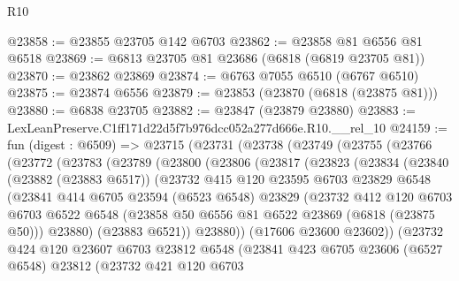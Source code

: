 \begin{lexlean}{R10}
\begin{coremodule}
@23858 := @23855 @23705 @142 @6703
@23862 := @23858 @81 @6556 @81 @6518
@23869 := @6813 @23705 @81 @23686 (@6818 (@6819 @23705 @81))
@23870 := @23862 @23869
@23874 := @6763 @7055 @6510 (@6767 @6510)
@23875 := @23874 @6556
@23879 := @23853 (@23870 (@6818 (@23875 @81)))
@23880 := @6838 @23705
@23882 := @23847 (@23879 @23880)
@23883 := LexLeanPreserve.C1ff171d22d5f7b976dcc052a277d666e.R10.__rel_10
@24159 := fun (digest : @6509) =>
  @23715
    (@23731
      (@23738
        (@23749
          (@23755
            (@23766
              (@23772
                (@23783
                  (@23789
                    (@23800
                      (@23806
                        (@23817
                          (@23823
                            (@23834
                              (@23840
                                (@23882 (@23883 @6517))
                                (@23732
                                  @415
                                  @120
                                  @23595
                                  @6703
                                  @23829
                                  @6548
                                  (@23841
                                    @414
                                    @6705
                                    @23594
                                    (@6523 @6548)
                                    @23829
                                    (@23732
                                      @412
                                      @120
                                      @6703
                                      @6703
                                      @6522
                                      @6548
                                      (@23858 @50 @6556 @81 @6522 @23869 (@6818 (@23875 @50)))
                                      @23880)
                                    (@23883 @6521))
                                  @23880))
                              (@17606 @23600 @23602))
                            (@23732
                              @424
                              @120
                              @23607
                              @6703
                              @23812
                              @6548
                              (@23841
                                @423
                                @6705
                                @23606
                                (@6527 @6548)
                                @23812
                                (@23732
                                  @421
                                  @120
                                  @6703

\end{coremodule}
\end{lexlean}
